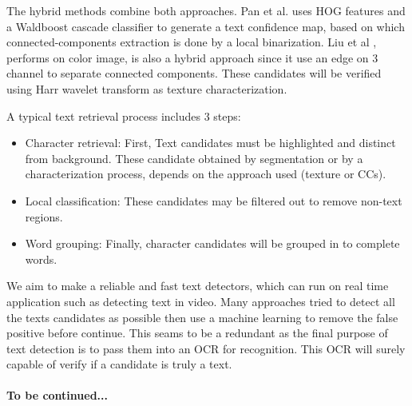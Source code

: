 \par
The hybrid methods combine both approaches. Pan et al. \cite{Pan2009} uses HOG features and a Waldboost cascade classifier to generate a text confidence map, based on which connected-components extraction is done by a local binarization. Liu et al \cite{Liu.2006.CRA}, performs on color image, is also a hybrid approach since it use an edge on 3 channel to separate connected components. These candidates will be verified using Harr wavelet transform as texture characterization.
\par
A typical text retrieval process includes 3 steps:
\begin{itemize}\item
Character retrieval: First, Text candidates must be highlighted and distinct from background. These candidate obtained by segmentation or by a characterization process, depends on the approach used (texture or CCs).
\item
Local classification: These candidates may be filtered out to remove non-text regions.
\item
Word grouping: Finally, character candidates will be grouped in to complete words. 
\end{itemize}
\par 
We aim to make a reliable and fast text detectors, which can run on real time application such as detecting text in video. Many approaches  tried to detect all the texts candidates as possible then use a machine learning to remove the false positive before continue. This seams to be a redundant as the final purpose of text detection is to pass them into an OCR for recognition. This OCR will surely capable of verify if a candidate is truly a text.
\paragraph{To be continued...}
